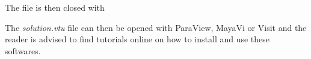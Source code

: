 

The file is then closed with



The {\sl solution.vtu} file can then be opened with ParaView, MayaVi or Visit and the reader 
is advised to find tutorials online on how to install and use these softwares. 



